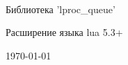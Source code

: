 \documentclass[a4paper,12pt,russian, oneside]{article}
\begin{document}
\begin{comment}
  \subsection*{Подсекция}

    \paragraph*{Параграф}
    \

\begin{figure}[H]%
  \centering
  \texttt{[image: origin/LinuxDeviceDriversDevelopment\_ColorImages.pdf]}%
  \caption{Шинная архитектура драйверов с сновной псевдошиной} 
\end{figure}%

\small
\begin{longtable}{|C{50mm}|C{100mm}|}
  \caption{Прерывания} \label{t:interrupts} \\
  \hline
  \rowcolor{Gray}
  \multicolumn{1}{|C{50mm}|}{\centering Номер прерывания} &
  \multicolumn{1}{L{100mm}|}{\centering Описание} \\\hline
  \endfirsthead
  \caption*{Продолжение таблицы \ref{t:interrupts}} \\
  \hline
  \rowcolor{Gray}
  \multicolumn{1}{|C{50mm}|}{\centering Номер прерывания} &
  \multicolumn{1}{L{100mm}|}{\centering Описание} \\\hline
  \endhead
   0      &  Ошибка деления на ноль    \\ \hline
\end{longtable} \normalsize



\end{comment}
\pagestyle{empty} %
\

\vspace{70mm}
\parbox{1\textwidth}{\centering
\LARGE Библиотека 'lproc\_queue'

\Large Расширение языка lua 5.3+
}

\vspace{155mm}
\parbox{1\textwidth}{\centering
\today
}
\end{document}
